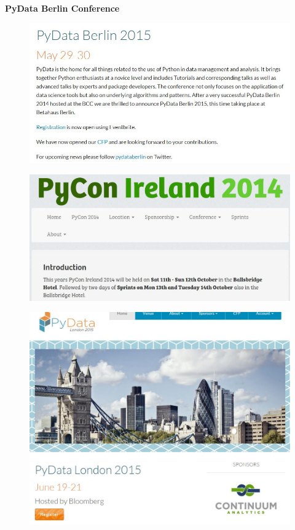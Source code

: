\documentclass[MASTER.tex]{subfiles}
\begin{document}
	\begin{frame}
			\textbf{PyData Berlin Conference}
		\begin{figure}

\centering
\includegraphics[width=1.10\linewidth]{pydataberlinsiteinfo}

\end{figure}
\end{frame}
\begin{frame}
	
\begin{figure}
\centering
\includegraphics[width=1.1\linewidth]{pyconsiteinfo}

\end{figure}
\end{frame}
\begin{frame}
\begin{figure}
\centering
\includegraphics[width=1.1\linewidth]{pydatalondon}
\end{figure}
\end{frame}
\end{document}
